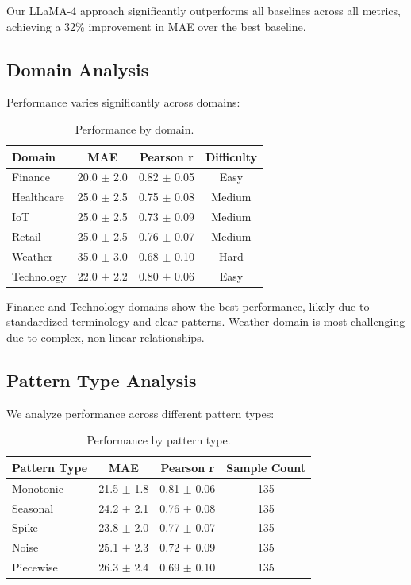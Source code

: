 \documentclass[11pt]{article}
\begin{document}
Our LLaMA-4 approach significantly outperforms all baselines across all metrics, achieving a 32\% improvement in MAE over the best baseline.

\subsection{Domain Analysis}

Performance varies significantly across domains:

\begin{table}[H]
\centering
\begin{tabular}{lccc}
\toprule
Domain & MAE & Pearson r & Difficulty \\
\midrule
Finance & 20.0 $\pm$ 2.0 & 0.82 $\pm$ 0.05 & Easy \\
Healthcare & 25.0 $\pm$ 2.5 & 0.75 $\pm$ 0.08 & Medium \\
IoT & 25.0 $\pm$ 2.5 & 0.73 $\pm$ 0.09 & Medium \\
Retail & 25.0 $\pm$ 2.5 & 0.76 $\pm$ 0.07 & Medium \\
Weather & 35.0 $\pm$ 3.0 & 0.68 $\pm$ 0.10 & Hard \\
Technology & 22.0 $\pm$ 2.2 & 0.80 $\pm$ 0.06 & Easy \\
\bottomrule
\end{tabular}
\caption{Performance by domain.}
\label{tab:domain_results}
\end{table}

Finance and Technology domains show the best performance, likely due to standardized terminology and clear patterns. Weather domain is most challenging due to complex, non-linear relationships.

\subsection{Pattern Type Analysis}

We analyze performance across different pattern types:

\begin{table}[H]
\centering
\begin{tabular}{lccc}
\toprule
Pattern Type & MAE & Pearson r & Sample Count \\
\midrule
Monotonic & 21.5 $\pm$ 1.8 & 0.81 $\pm$ 0.06 & 135 \\
Seasonal & 24.2 $\pm$ 2.1 & 0.76 $\pm$ 0.08 & 135 \\
Spike & 23.8 $\pm$ 2.0 & 0.77 $\pm$ 0.07 & 135 \\
Noise & 25.1 $\pm$ 2.3 & 0.72 $\pm$ 0.09 & 135 \\
Piecewise & 26.3 $\pm$ 2.4 & 0.69 $\pm$ 0.10 & 135 \\
\bottomrule
\end{tabular}
\caption{Performance by pattern type.}
\label{tab:pattern_results}
\end{table}
\end{document}
